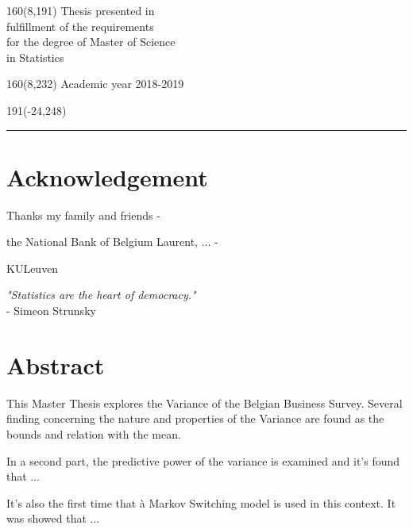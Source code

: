 \documentclass[12pt,a4paper,oneside]{book}
\begin{document}
%
\begin{textblock}{160}(8,191)
\textblockcolour{}
\vspace{-\parskip}
\flushright
Thesis presented in\\[4.5pt]
fulfillment of the requirements\\[4.5pt]
for the degree of Master of Science\\[4.5pt]
in Statistics\\
\end{textblock}
%
\begin{textblock}{160}(8,232)
\textblockcolour{}
\vspace{-\parskip}
\flushright
Academic year 2018-2019
\end{textblock}
%
\begin{textblock}{191}(-24,248)
{\color{blueline}\rule{550pt}{5.5pt}}
\end{textblock}
%
\vfill
\newpage

\rmfamily
\setcounter{page}{0}
\pagestyle{plain}



\chapter*{Acknowledgement}
Thanks my family and friends - 

the National Bank of Belgium Laurent, ... - 

KULeuven

\textit{"Statistics are the heart of democracy." }\\
- Simeon Strunsky

\chapter*{Abstract}

This Master Thesis explores the Variance of the Belgian Business Survey. 
Several finding concerning the nature and properties of the Variance are found as the bounds and relation with the mean.

In a second part, the predictive power of the variance is examined and it's found that ...

It's also the first time that à Markov Switching model is used in this context. It was showed that ...
\end{document}

